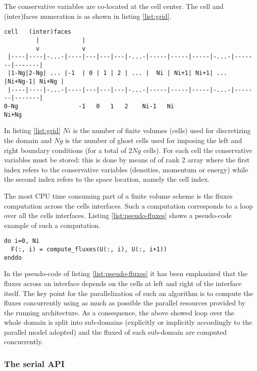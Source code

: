 The conservative variables are co-located at the cell center. The cell and (inter)faces numeration is as shown in listing \ref{list:grid}.
\begin{lstlisting}[firstnumber=1,style=codesimple,caption={Numerical grid organization},label={list:grid}]
        cell   (inter)faces
         |            |
         v            v
 |----|----|-...-|----|---|---|---|-...-|-----|-----|-----|-...-|-------|-------|
 |1-Ng|2-Ng| ... |-1  | 0 | 1 | 2 | ... |  Ni | Ni+1| Ni+1| ... |Ni+Ng-1| Ni+Ng |
 |----|----|-...-|----|---|---|---|-...-|-----|-----|-----|-...-|-------|-------|
0-Ng                 -1   0   1   2    Ni-1   Ni                      Ni+Ng
\end{lstlisting}
In listing \ref{list:grid} $Ni$ is the number of finite volumes (cells) used for discretizing the domain and $Ng$ is the number of ghost cells used for imposing the left and right boundary conditions (for a total of $2Ng$ cells).
For each cell the conservative variables must be stored: this is done by means of of rank 2 array where the first index refers to the conservative variables (densities, momentum or energy) while the second index refers to the space location, namely the cell index.

The most CPU time consuming part of a finite volume scheme is the fluxes computation across the cells interfaces. Such a computation corresponds to a loop over all the cells interfaces. Listing \ref{list:pseudo-fluxes} shows a pseudo-code example of such a computation.

\begin{lstlisting}[firstnumber=1,style=code,caption={Pseudo-code example of fluxes computation},label={list:pseudo-fluxes}]
do i=0, Ni
  F(:, i) = compute_fluxes(U(:, i), U(:, i+1))
enddo
\end{lstlisting}

In the pseudo-code of listing \ref{list:pseudo-fluxes} it has been emphasized that the fluxes across an interface depends on the cells at left and right of the interface itself. The key point for the parallelization of such an algorithm is to compute the fluxes concurrently using as much as possible the parallel resources provided by the running architecture. As a consequence, the above showed loop over the whole domain is split into sub-domains (explicitly or implicitly accordingly to the parallel model adopted) and the fluxed of each sub-domain are computed concurrently.

\subsubsection{The serial API}

